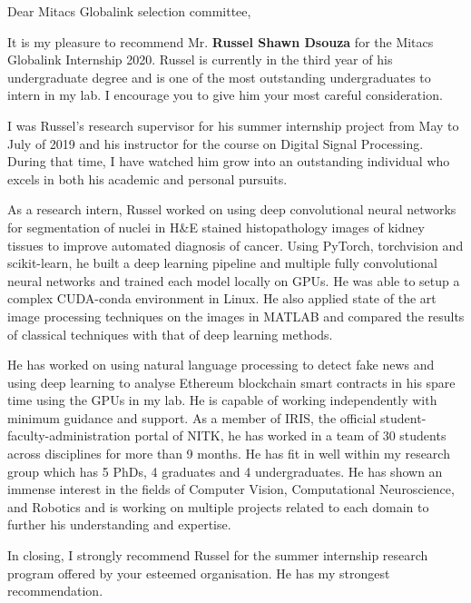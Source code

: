 \documentclass[12pt]{article}
\begin{document}
  \noindent
  Dear Mitacs Globalink selection committee,

  \bigskip
  \noindent
  It is my pleasure to recommend Mr. \textbf{Russel Shawn Dsouza} for the Mitacs Globalink Internship 2020. Russel is currently in the third year of his undergraduate degree and is one of the most outstanding undergraduates to intern in my lab. I encourage you to give him your most careful consideration.

  \medskip
  \noindent
  I was Russel's research supervisor for his summer internship project from May to July of 2019 and his instructor for the course on Digital Signal Processing.
  During that time, I have watched him grow into an outstanding individual who excels in both his academic and personal pursuits.

  \medskip
  \noindent
  As a research intern, Russel worked on using deep convolutional neural networks for segmentation of nuclei in H\&E stained histopathology images of kidney tissues to improve automated diagnosis of cancer.
  Using PyTorch, torchvision and scikit-learn, he built a deep learning pipeline and multiple fully convolutional neural networks and trained each model locally on GPUs. 
  He was able to setup a complex CUDA-conda environment in Linux.
  He also applied state of the art image processing techniques on the images in MATLAB and compared the results of classical techniques with that of deep learning methods.

  \medskip
  \noindent
  He has worked on using natural language processing to detect fake news and using deep learning to analyse Ethereum blockchain smart contracts in his spare time using the GPUs in my lab.
  He is capable of working independently with minimum guidance and support. 
  As a member of IRIS, the official student-faculty-administration portal of NITK, he has worked in a team of 30 students across disciplines for more than 9 months.
  He has fit in well within my research group which has 5 PhDs, 4 graduates and 4 undergraduates.
  He has shown an immense interest in the fields of Computer Vision, Computational Neuroscience, and Robotics and is working on multiple projects related to each domain to further his understanding and expertise.

  \medskip
  \noindent
  In closing, I strongly recommend Russel for the summer internship research program offered by your esteemed organisation. He has my strongest recommendation.
\end{document}

